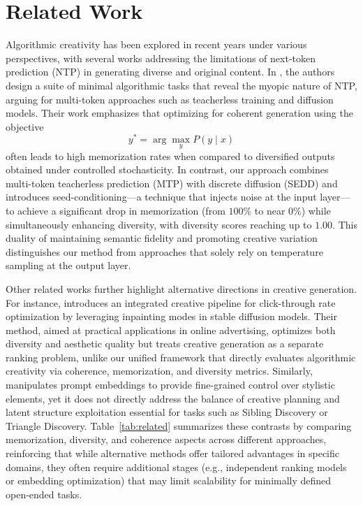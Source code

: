 \documentclass{article} %
\begin{document}
\section{Related Work}
Algorithmic creativity has been explored in recent years under various perspectives, with several works addressing the limitations of next-token prediction (NTP) in generating diverse and original content. In \cite{nagarajan2025roll}, the authors design a suite of minimal algorithmic tasks that reveal the myopic nature of NTP, arguing for multi-token approaches such as teacherless training and diffusion models. Their work emphasizes that optimizing for coherent generation using the objective 
\[
y^* = \arg\max_{y} P(y \mid x)
\]
often leads to high memorization rates when compared to diversified outputs obtained under controlled stochasticity. In contrast, our approach combines multi-token teacherless prediction (MTP) with discrete diffusion (SEDD) and introduces seed-conditioning—a technique that injects noise at the input layer—to achieve a significant drop in memorization (from \(100\%\) to near \(0\%\)) while simultaneously enhancing diversity, with diversity scores reaching up to \(1.00\). This duality of maintaining semantic fidelity and promoting creative variation distinguishes our method from approaches that solely rely on temperature sampling at the output layer.

Other related works further highlight alternative directions in creative generation. For instance, \cite{yang2024new} introduces an integrated creative pipeline for click-through rate optimization by leveraging inpainting modes in stable diffusion models. Their method, aimed at practical applications in online advertising, optimizes both diversity and aesthetic quality but treats creative generation as a separate ranking problem, unlike our unified framework that directly evaluates algorithmic creativity via coherence, memorization, and diversity metrics. Similarly, \cite{deckers2023manipulating} manipulates prompt embeddings to provide fine-grained control over stylistic elements, yet it does not directly address the balance of creative planning and latent structure exploitation essential for tasks such as Sibling Discovery or Triangle Discovery. Table~\ref{tab:related} summarizes these contrasts by comparing memorization, diversity, and coherence aspects across different approaches, reinforcing that while alternative methods offer tailored advantages in specific domains, they often require additional stages (e.g., independent ranking models or embedding optimization) that may limit scalability for minimally defined open-ended tasks.
\end{document}
